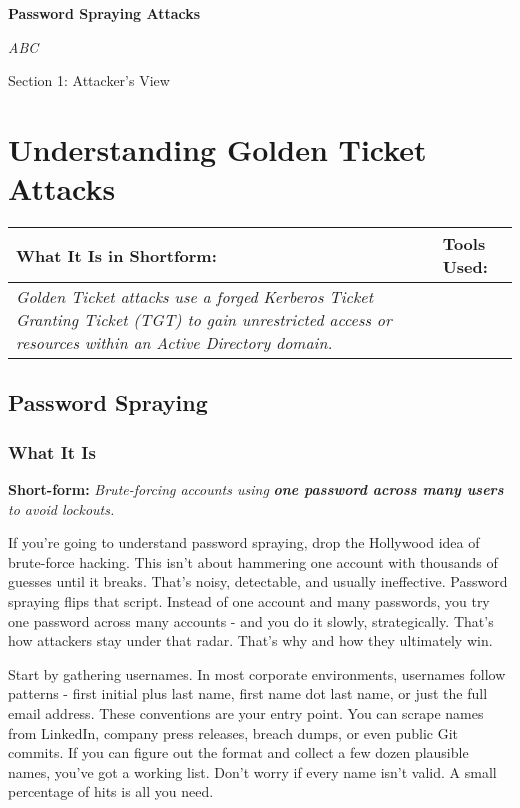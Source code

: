 
\textbf{Password Spraying Attacks}

\textit{ABC}

Section 1: Attacker’s View

\section{\textbf{Understanding Golden Ticket Attacks}}

\begin{table}
\justifying

\begin{tabular}{| l | l |}
\hline
\textbf{What It Is in Shortform:} & \textbf{Tools Used:} \\
\hline
\textit{Golden Ticket attacks use a forged Kerberos Ticket Granting Ticket (TGT) to gain unrestricted access or resources within an Active Directory domain.} &  \\
\hline

\end{tabular}

\end{table}

\subsection{\textbf{Password Spraying}}

\subsubsection{\textbf{What It Is}}

\textbf{Short-form: }\textit{Brute-forcing accounts using }\textit{\textbf{one password across many users}}\textit{ to avoid lockouts.}

If you’re going to understand password spraying, drop the Hollywood idea of brute-force hacking. This isn’t about hammering one account with thousands of guesses until it breaks. That’s noisy, detectable, and usually ineffective. Password spraying flips that script. Instead of one account and many passwords, you try one password across many accounts - and you do it slowly, strategically. That’s how attackers stay under that radar. That’s why and how they ultimately win.

Start by gathering usernames. In most corporate environments, usernames follow patterns - first initial plus last name, first name dot last name, or just the full email address. These conventions are your entry point. You can scrape names from LinkedIn, company press releases, breach dumps, or even public Git commits. If you can figure out the format and collect a few dozen plausible names, you’ve got a working list. Don’t worry if every name isn’t valid. A small percentage of hits is all you need.

